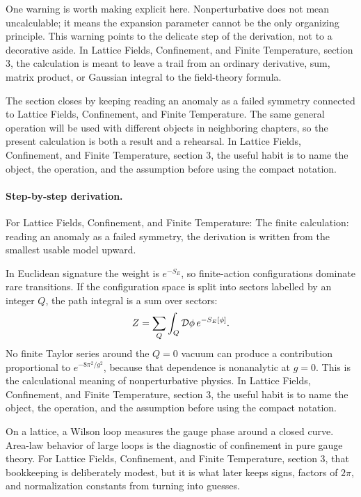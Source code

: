 One warning is worth making explicit here.  Nonperturbative does not mean uncalculable; it means the expansion parameter cannot be the only organizing principle.  This warning points to the delicate step of the derivation, not to a decorative aside.  In Lattice Fields, Confinement, and Finite Temperature, section 3, the calculation is meant to leave a trail from an ordinary derivative, sum, matrix product, or Gaussian integral to the field-theory formula.

The section closes by keeping reading an anomaly as a failed symmetry connected to Lattice Fields, Confinement, and Finite Temperature.  The same general operation will be used with different objects in neighboring chapters, so the present calculation is both a result and a rehearsal.  In Lattice Fields, Confinement, and Finite Temperature, section 3, the useful habit is to name the object, the operation, and the assumption before using the compact notation.



\paragraph{Step-by-step derivation.}

For Lattice Fields, Confinement, and Finite Temperature: The finite calculation: reading an anomaly as a failed symmetry, the derivation is written from the smallest usable model upward.

In Euclidean signature the weight is \(e^{-S_E}\), so finite-action configurations dominate rare transitions.  If the configuration space is split into sectors labelled by an integer \(Q\), the path integral is a sum over sectors:
\[
  Z=\sum_Q\int_Q\mathcal D\phi\,e^{-S_E[\phi]}.
\]
No finite Taylor series around the \(Q=0\) vacuum can produce a contribution proportional to \(e^{-8\pi^2/g^2}\), because that dependence is nonanalytic at \(g=0\).  This is the calculational meaning of nonperturbative physics.  In Lattice Fields, Confinement, and Finite Temperature, section 3, the useful habit is to name the object, the operation, and the assumption before using the compact notation.

On a lattice, a Wilson loop measures the gauge phase around a closed curve.  Area-law behavior of large loops is the diagnostic of confinement in pure gauge theory.  For Lattice Fields, Confinement, and Finite Temperature, section 3, that bookkeeping is deliberately modest, but it is what later keeps signs, factors of \(2\pi\), and normalization constants from turning into guesses.

